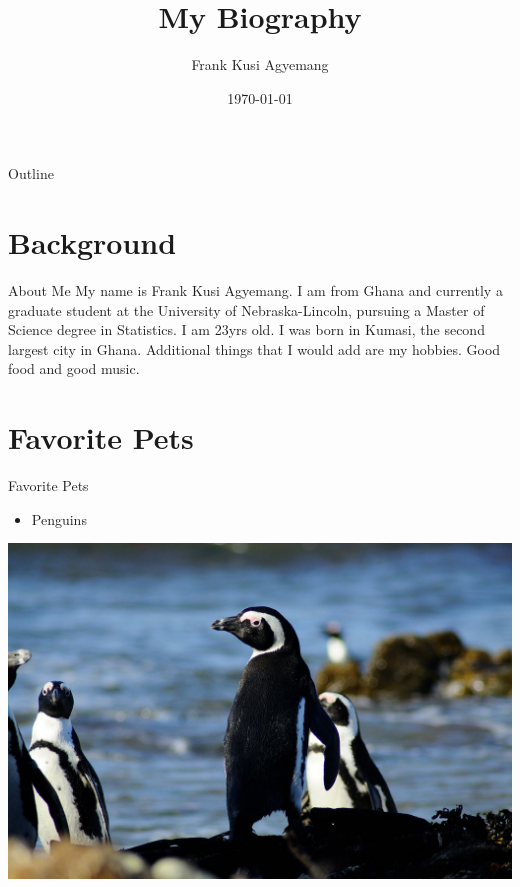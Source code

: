 \documentclass{beamer}					%
\title{My Biography}  %
\author{Frank Kusi Agyemang}                              %
\institute{University of Nebraska-Lincoln}                  %
\date{\today}                                    %
\begin{document}



\begin{frame}
  \titlepage 
\end{frame}


\begin{frame}{Outline}
  \tableofcontents 
\end{frame}

\section{Background}

\begin{frame}{About Me}
	My name is Frank Kusi Agyemang. I am from Ghana and currently a graduate student at the University of Nebraska-Lincoln, pursuing a Master of Science degree in Statistics. I am 23yrs old. I was born in Kumasi, the second largest city in Ghana. Additional things that I would add are my hobbies. Good food and good music.
\end{frame}

\section{Favorite Pets}

\begin{frame}{Favorite Pets}
\begin{itemize}
        \item Penguins
	\end{itemize}
\includegraphics[scale=0.6]{penguin.png}
\end{frame}
\end{document}
